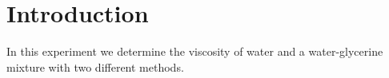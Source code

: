 \section{Introduction}

In this experiment we determine the viscosity of water and a water-glycerine mixture with two different methods.



